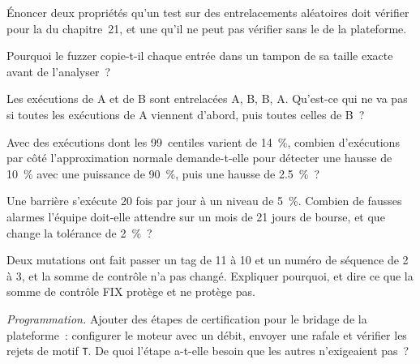 \begin{exercise}[$\star$]\label{exo:ll:testing-and-deploying-low-latency-systems:1}
Énoncer deux propriétés qu'un test sur des entrelacements aléatoires doit vérifier pour la  du chapitre~21, et une
qu'il ne peut pas vérifier sans le  de la plateforme.
\end{exercise}

\begin{exercise}[$\star$]\label{exo:ll:testing-and-deploying-low-latency-systems:2}
Pourquoi le fuzzer copie-t-il chaque entrée dans un tampon de sa taille exacte avant de l'analyser~?
\end{exercise}

\begin{exercise}[$\star$]\label{exo:ll:testing-and-deploying-low-latency-systems:3}
Les exécutions de A et de B sont entrelacées A, B, B, A. Qu'est-ce qui ne va pas si toutes les exécutions de A viennent d'abord, puis toutes celles de B~?
\end{exercise}

\begin{exercise}[$\star\star$]\label{exo:ll:testing-and-deploying-low-latency-systems:4}
Avec des exécutions dont les 99~centiles varient de 14~\%, combien d'exécutions par côté l'approximation normale demande-t-elle pour détecter une hausse de 10~\%
avec une puissance de 90~\%, puis une hausse de 2.5~\%~?
\end{exercise}

\begin{exercise}[$\star\star$]\label{exo:ll:testing-and-deploying-low-latency-systems:5}
Une barrière s'exécute 20 fois par jour à un niveau de 5~\%. Combien de fausses alarmes l'équipe doit-elle attendre sur un mois de 21 jours de bourse, et
que change la tolérance de 2~\%~?
\end{exercise}

\begin{exercise}[$\star\star$]\label{exo:ll:testing-and-deploying-low-latency-systems:6}
Deux mutations ont fait passer un tag de 11 à 10 et un numéro de séquence de 2 à 3, et la somme de contrôle n'a pas changé. Expliquer pourquoi, et
dire ce que la somme de contrôle FIX protège et ne protège pas.
\end{exercise}

\begin{exercise}[$\star\star\star$]\label{exo:ll:testing-and-deploying-low-latency-systems:7}
\emph{Programmation.} Ajouter des étapes de certification pour le bridage de la plateforme~: configurer le moteur avec un débit, envoyer une rafale et vérifier les
rejets de motif \texttt{T}. De quoi l'étape a-t-elle besoin que les autres n'exigeaient pas~?
\end{exercise}

